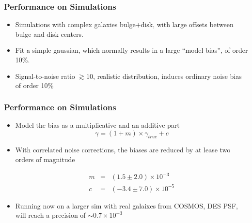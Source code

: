 \documentclass{beamer}
\begin{document}
\frame
{
    \frametitle{Performance on Simulations}

 
    \begin{itemize}
        \item Simulations with complex galaxies bulge+disk, with large
            offsets between bulge and disk centers.

        \item Fit a simple gaussian, which normally results in a large ``model bias'',
            of order 10\%.
            
         \item Signal-to-noise ratio $\gtrsim$10, realistic distribution, 
             induces ordinary noise bias of order 10\%

    \end{itemize}

}

\frame
{
    \frametitle{Performance on Simulations}

 
    \begin{itemize}
            
            
         \item Model the bias as a multiplicative and an additive part
        {\color{lightskyblue} 
            \begin{equation}
                \gamma = (1 + m ) \times \gamma_{true} + c \nonumber
            \end{equation}
        }


         \item With correlated noise corrections, the biases are reduced
             by at lease two orders of magnitude

        {\color{gold} 
            \begin{eqnarray}
                m & = & (1.5 \pm 2.0) \times 10^{-3} \nonumber \\
                c & = & (-3.4 \pm 7.0) \times 10^{-5} \nonumber
            \end{eqnarray}
        }
         \item Running now on a larger sim with real galaixes from COSMOS, DES PSF,
            will reach a precision of $\sim 0.7 \times 10^{-3}$

    \end{itemize}

}
\end{document}
